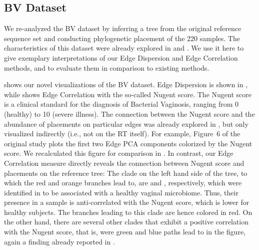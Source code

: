 
\subsection{BV Dataset}
\label{ch:Visualization:sec:Results:sub:BVDataset}

We re-analyzed the \ac{BV} dataset by inferring a tree from the original reference sequence set
and conducting phylogenetic placement of the \num{220} samples.
The characteristics of this dataset were already explored in \cite{Srinivasan2012} and \cite{Matsen2011a}.
We use it here to give exemplary interpretations of our Edge Dispersion and Edge Correlation methods,
and to evaluate them in comparison to existing methods.

 shows our novel visualizations of the \ac{BV} dataset.
Edge Dispersion is shown in ,
while  shows Edge Correlation with the so-called Nugent score. %
The Nugent score \cite{Nugent1991} is a clinical standard for the diagnosis of Bacterial Vaginosis,
ranging from \num{0} (healthy) to \num{10} (severe illness).
The connection between the Nugent score and the abundance of placements on particular edges
was already explored in \cite{Matsen2011a}, but only visualized indirectly (i.e., not on the \ac{RT} itself).
For example, Figure~6 of the original study plots the first two Edge PCA components colorized by the Nugent score.
We recalculated this figure for comparison in .
In contrast, our Edge Correlation measure directly reveals the connection between Nugent score and placements on the reference tree:
The clade on the left hand side of the tree, to which the red and orange branches lead to,
are  and , respectively,
which were identified in \cite{Srinivasan2012} to be associated with a healthy vaginal microbiome.
Thus, their presence in a sample is anti-correlated with the Nugent score, which is lower for healthy subjects.
The branches leading to this clade are hence colored in red.
On the other hand, there are several other clades that exhibit a positive correlation with the Nugent score,
that is, were green and blue paths lead to in the figure,
again a finding already reported in \cite{Srinivasan2012}.

